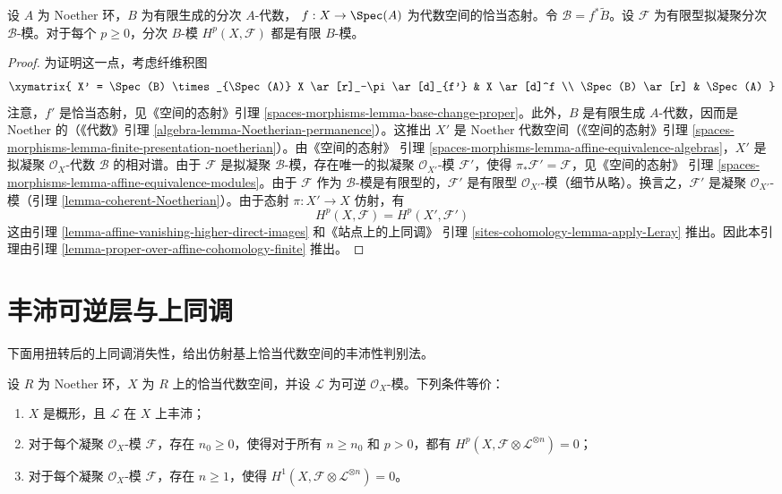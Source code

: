 \begin{lemma}
\label{lemma-graded-finiteness}
设 $A$ 为 Noether 环，$B$ 为有限生成的分次 $A$-代数，
$f : X \to \Spec(A)$ 为代数空间的恰当态射。令
$\mathcal{B} = f^*\widetilde B$。设 $\mathcal{F}$ 为有限型拟凝聚分次
$\mathcal{B}$-模。对于每个 $p \geq 0$，分次 $B$-模
$H^p(X, \mathcal{F})$ 都是有限 $B$-模。
\end{lemma}

\begin{proof}
为证明这一点，考虑纤维积图
$$
\xymatrix{
X' = \Spec(B) \times_{\Spec(A)} X
\ar[r]_-\pi \ar[d]_{f'} &
X \ar[d]^f \\
\Spec(B) \ar[r] &
\Spec(A)
}
$$
注意，$f'$ 是恰当态射，见《空间的态射》引理
\ref{spaces-morphisms-lemma-base-change-proper}。此外，$B$ 是有限生成
$A$-代数，因而是 Noether 的（《代数》引理
\ref{algebra-lemma-Noetherian-permanence}）。这推出 $X'$ 是 Noether
代数空间（《空间的态射》引理
\ref{spaces-morphisms-lemma-finite-presentation-noetherian}）。由《空间的态射》
引理 \ref{spaces-morphisms-lemma-affine-equivalence-algebras}，$X'$ 是拟凝聚
$\mathcal{O}_X$-代数 $\mathcal{B}$ 的相对谱。由于 $\mathcal{F}$ 是拟凝聚
$\mathcal{B}$-模，存在唯一的拟凝聚 $\mathcal{O}_{X'}$-模
$\mathcal{F}'$，使得 $\pi_*\mathcal{F}' = \mathcal{F}$，见《空间的态射》
引理 \ref{spaces-morphisms-lemma-affine-equivalence-modules}。由于
$\mathcal{F}$ 作为 $\mathcal{B}$-模是有限型的，$\mathcal{F}'$ 是有限型
$\mathcal{O}_{X'}$-模（细节从略）。换言之，$\mathcal{F}'$ 是凝聚
$\mathcal{O}_{X'}$-模（引理 \ref{lemma-coherent-Noetherian}）。由于态射
$\pi : X' \to X$ 仿射，有
$$
H^p(X, \mathcal{F}) = H^p(X', \mathcal{F}')
$$
这由引理 \ref{lemma-affine-vanishing-higher-direct-images} 和《站点上的上同调》
引理 \ref{sites-cohomology-lemma-apply-Leray} 推出。因此本引理由引理
\ref{lemma-proper-over-affine-cohomology-finite} 推出。
\end{proof}









\section{丰沛可逆层与上同调}
\label{section-ample-cohomology}

\noindent
下面用扭转后的上同调消失性，给出仿射基上恰当代数空间的丰沛性判别法。

\begin{lemma}
\label{lemma-vanshing-gives-ample}
设 $R$ 为 Noether 环，$X$ 为 $R$ 上的恰当代数空间，并设 $\mathcal{L}$
为可逆 $\mathcal{O}_X$-模。下列条件等价：
\begin{enumerate}
\item $X$ 是概形，且 $\mathcal{L}$ 在 $X$ 上丰沛；
\item 对于每个凝聚 $\mathcal{O}_X$-模 $\mathcal{F}$，存在
$n_0 \geq 0$，使得对于所有 $n \geq n_0$ 和 $p > 0$，都有
$H^p(X, \mathcal{F} \otimes \mathcal{L}^{\otimes n}) = 0$；
\item 对于每个凝聚 $\mathcal{O}_X$-模 $\mathcal{F}$，存在
$n \geq 1$，使得
$H^1(X, \mathcal{F} \otimes \mathcal{L}^{\otimes n}) = 0$。
\end{enumerate}
\end{lemma}


